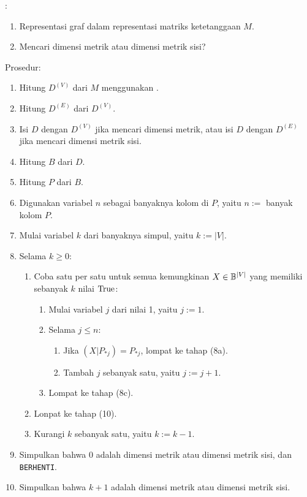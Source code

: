 \begin{algorithm}[H]
	:
	\begin{enumerate}
		\item Representasi graf dalam representasi matriks ketetanggaan \(M\).
		\item Mencari dimensi metrik atau dimensi metrik sisi?
	\end{enumerate}
	Prosedur:
	\begin{enumerate}
		\item Hitung \(D^{(V)}\) dari \(M\) menggunakan .
		\item Hitung \(D^{(E)}\) dari \(D^{(V)}\).
		\item Isi \(D\) dengan \(D^{(V)}\) jika mencari dimensi metrik, atau isi \(D\) dengan \(D^{(E)}\) jika mencari dimensi metrik sisi.
		\item Hitung \(B\) dari \(D\).
		\item Hitung \(P\) dari \(B\).
		\item Digunakan variabel \(n\) sebagai banyaknya kolom di \(P\), yaitu \(n :=\) banyak kolom \(P\).
		\item Mulai variabel \(k\) dari banyaknya simpul, yaitu \(k := |V|\).
		\item Selama \(k \geq 0\):
			\begin{enumerate}
				\item Coba satu per satu untuk semua kemungkinan \(X \in \Bbb^{|V|}\) yang memiliki sebanyak \(k\) nilai \(\True\):
					\begin{enumerate}
						\item Mulai variabel \(j\) dari nilai 1, yaitu \(j := 1\).
						\item Selama \(j \leq n\):
							\begin{enumerate}
								\item Jika \((X|P_{*j}) = P_{*j}\), lompat ke tahap (8a).
								\item Tambah \(j\) sebanyak satu, yaitu \(j := j + 1\).
							\end{enumerate}
						\item Lompat ke tahap (8c).
					\end{enumerate}
				\item Lonpat ke tahap (10).
				\item Kurangi \(k\) sebanyak satu, yaitu \(k := k - 1\).
			\end{enumerate}
		\item Simpulkan bahwa 0 adalah dimensi metrik atau dimensi metrik sisi, dan \texttt{BERHENTI}.
		\item Simpulkan bahwa \(k + 1\) adalah dimensi metrik atau dimensi metrik sisi.
	\end{enumerate}
	\caption{}
	\label{alg:brute-force}
\end{algorithm}

